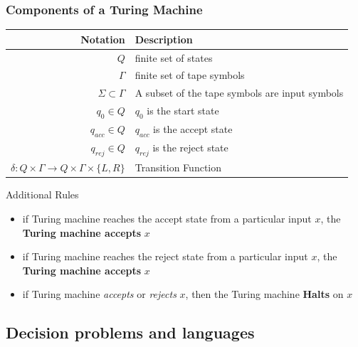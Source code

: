 \subsubsection*{Components of a Turing Machine}
\begin{center}
  \begin{tabular}{r|l}
    Notation                                                              & Description                                    \\
    \hline
    $Q$                                                                   & finite set of states                           \\
    $\Gamma$                                                              & finite set of tape symbols                     \\
    $\Sigma \subset \Gamma$                                               & A subset of the tape symbols are input symbols \\
    $q_0 \in Q$                                                           & $q_0$ is the start state                       \\
    $q_{acc} \in Q$                                                       & $q_{acc}$ is the accept state                  \\
    $q_{rej} \in Q$                                                       & $q_{rej}$ is the reject state                  \\
    $\delta : Q \times \Gamma \rightarrow Q \times \Gamma \times \{L,R\}$ & Transition Function
  \end{tabular}
\end{center}
Additional Rules
\begin{itemize}
  \item if Turing machine reaches the accept state from a particular input $x$, the \textbf{Turing machine accepts} $x$
  \item if Turing machine reaches the reject state from a particular input $x$, the \textbf{Turing machine accepts} $x$
  \item if Turing machine \textit{accepts} or \textit{rejects} $x$, then the Turing machine \textbf{Halts} on $x$
\end{itemize}
\subsection{Decision problems and languages}